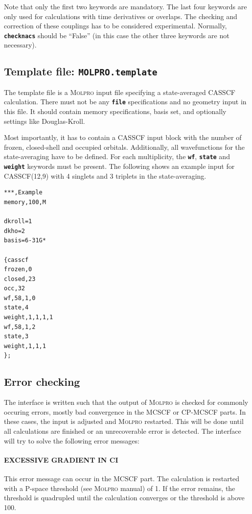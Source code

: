 \documentclass[a4paper,11pt,DIV=15,openany,twoside=false]{scrbook}
\newcommand{\ttt}[1]{\textbf{\texttt{#1}}}
\newenvironment{example}{
  \vspace{0mm}
  \definecolor{shadecolor}{HTML}{E4F4FF}
  \begin{shaded}
}{
  \end{shaded}
}
\begin{document}
Note that only the first two keywords are mandatory. The last four keywords are only used for calculations with time derivatives or overlaps. The checking and correction of these couplings has to be considered experimental. Normally, \ttt{checknacs} should be ``False'' (in this case the other three keywords are not necessary).

\subsection{Template file: \ttt{MOLPRO.template}}

The template file is a \textsc{Molpro} input file specifying a state-averaged CASSCF calculation. There must not be any \ttt{file} specifications and no geometry input in this file. It should contain memory specifications, basis set, and optionally settings like Douglas-Kroll.

Most importantly, it has to contain a CASSCF input block with the number of frozen, closed-shell and occupied orbitals. Additionally, all wavefunctions for the state-averaging have to be defined. For each multiplicity, the \ttt{wf}, \ttt{state} and \ttt{weight} keywords must be present. The following shows an example input for CASSCF(12,9) with 4 singlets and 3 triplets in the state-averaging.
\begin{example}
  \begin{verbatim}
***,Example
memory,100,M

dkroll=1
dkho=2
basis=6-31G*

{casscf
frozen,0
closed,23
occ,32
wf,58,1,0
state,4
weight,1,1,1,1
wf,58,1,2
state,3
weight,1,1,1
};
  \end{verbatim}
\end{example}

\subsection{Error checking}

The interface is written such that the output of \textsc{Molpro} is checked for commonly occuring errors, mostly bad convergence in the MCSCF or CP-MCSCF parts. In these cases, the input is adjusted and \textsc{Molpro} restarted. This will be done until all calculations are finished or an unrecoverable error is detected.
The interface will try to solve the following error messages:

\paragraph{EXCESSIVE GRADIENT IN CI} This error message can occur in the MCSCF part. The calculation is restarted with a P-space threshold (see \textsc{Molpro} manual) of 1. If the error remains, the threshold is quadrupled until the calculation converges or the threshold is above 100.
\end{document}
